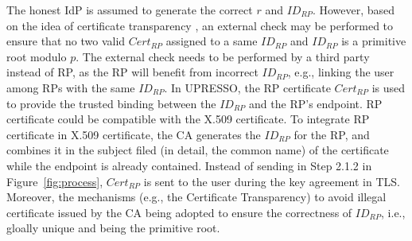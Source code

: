  The honest IdP is assumed to generate the correct $r$ and $ID_{RP}$.
However, based on the idea of certificate transparency \cite{rfc6962},
an external check may be performed to ensure that  no two valid $Cert_{RP}$ assigned to a same $ID_{RP}$ and $ID_{RP}$ is a primitive root modulo $p$.
The external check needs to be performed by a third party instead of RP, as the RP will benefit from incorrect $ID_{RP}$, e.g., linking the user among RPs with the same  $ID_{RP}$.
In UPRESSO, the RP certificate $Cert_{RP}$ is used to provide the trusted binding between the $ID_{RP}$ and the RP's endpoint. RP certificate could be compatible with the X.509 certificate. To integrate RP certificate in X.509 certificate, the CA generates the $ID_{RP}$ for the RP, and combines it in the subject  filed (in detail, the common name)  of the certificate while the endpoint is already contained. Instead of sending  in Step 2.1.2 in Figure~\ref{fig:process}, $Cert_{RP}$  is sent to the user during the key agreement in TLS. Moreover, the mechanisms (e.g., the Certificate Transparency) to avoid illegal certificate issued by the CA being adopted to ensure the correctness of $ID_{RP}$, i.e., gloally unique and being the primitive root.



